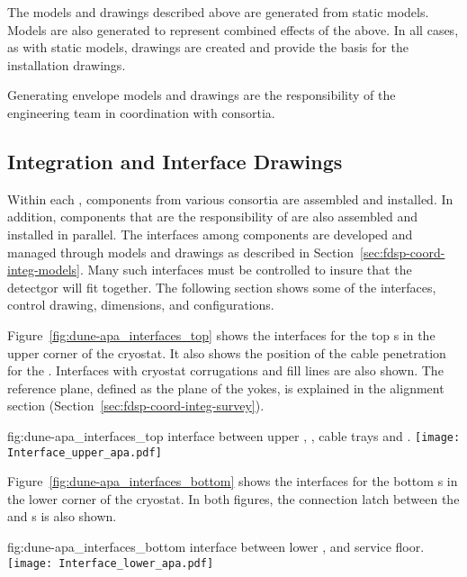 The models and drawings described above are generated from static
models. Models are also generated to represent combined effects of the
above. In all cases, as with static models, \twod drawings are created
and provide the basis for the installation drawings.


Generating envelope models and drawings are the responsibility of the
 engineering team in coordination with consortia.


\subsection{Integration and Interface Drawings}
\label{sec:fdsp-coord-integ-drawings}

Within each , components from various consortia are
assembled and installed. In addition, components that are the
responsibility of  are also assembled and installed in
parallel. The interfaces among components are developed and managed
through models and drawings as described in
Section~\ref{sec:fdsp-coord-integ-models}. Many such interfaces must
be controlled to insure that the detectgor will fit together. The
following section shows some of the interfaces, control drawing,
dimensions, and configurations.


Figure~\ref{fig:dune-apa_interfaces_top} shows the interfaces for the
top s in the upper corner of the cryostat. It also shows the position
of the cable penetration for the . Interfaces with cryostat
corrugations and  fill lines are also shown. The reference plane,
defined as the plane of the  yokes, is explained in the
alignment section (Section~\ref{sec:fdsp-coord-integ-survey}).
\begin{dunefigure}{fig:dune-apa_interfaces_top}
  { interface between upper , , cable
    trays and .}
  \texttt{[image: Interface\_upper\_apa.pdf]}
\end{dunefigure}


Figure~\ref{fig:dune-apa_interfaces_bottom} shows the interfaces for
the bottom s in the lower corner of the cryostat. In both figures,
the connection latch between the  and s is also
shown.
\begin{dunefigure}{fig:dune-apa_interfaces_bottom}
  { interface between lower ,  and 
    service floor.}
  \texttt{[image: Interface\_lower\_apa.pdf]}
\end{dunefigure}



